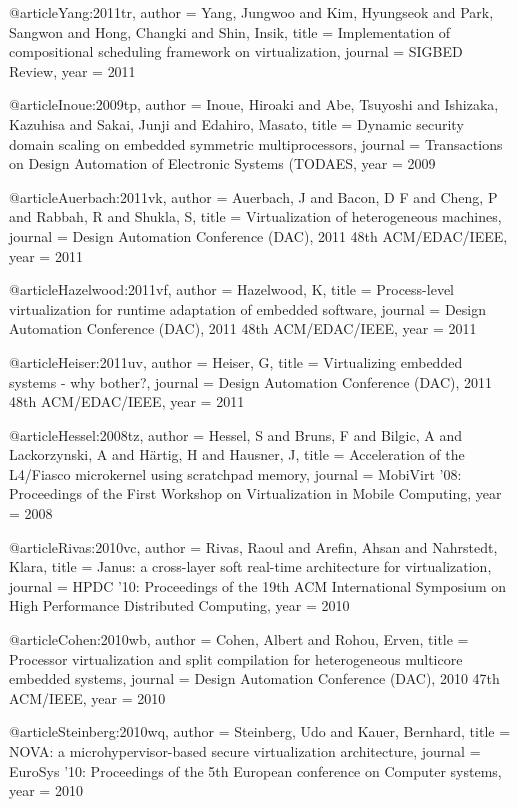 @article{Yang:2011tr,
author = {Yang, Jungwoo and Kim, Hyungseok and Park, Sangwon and Hong, Changki and Shin, Insik},
title = {{Implementation of compositional scheduling framework on virtualization}},
journal = {SIGBED Review},
year = {2011}
}

@article{Inoue:2009tp,
author = {Inoue, Hiroaki and Abe, Tsuyoshi and Ishizaka, Kazuhisa and Sakai, Junji and Edahiro, Masato},
title = {{Dynamic security domain scaling on embedded symmetric multiprocessors}},
journal = {Transactions on Design Automation of Electronic Systems (TODAES},
year = {2009}
}

@article{Auerbach:2011vk,
author = {Auerbach, J and Bacon, D F and Cheng, P and Rabbah, R and Shukla, S},
title = {{Virtualization of heterogeneous machines}},
journal = {Design Automation Conference (DAC), 2011 48th ACM/EDAC/IEEE},
year = {2011}
}

@article{Hazelwood:2011vf,
author = {Hazelwood, K},
title = {{Process-level virtualization for runtime adaptation of embedded software}},
journal = {Design Automation Conference (DAC), 2011 48th ACM/EDAC/IEEE},
year = {2011}
}

@article{Heiser:2011uv,
author = {Heiser, G},
title = {{Virtualizing embedded systems - why bother?}},
journal = {Design Automation Conference (DAC), 2011 48th ACM/EDAC/IEEE},
year = {2011}
}

@article{Hessel:2008tz,
author = {Hessel, S and Bruns, F and Bilgic, A and Lackorzynski, A and H{\"a}rtig, H and Hausner, J},
title = {{Acceleration of the L4/Fiasco microkernel using scratchpad memory}},
journal = {MobiVirt '08: Proceedings of the First Workshop on Virtualization in Mobile Computing},
year = {2008}
}

@article{Rivas:2010vc,
author = {Rivas, Raoul and Arefin, Ahsan and Nahrstedt, Klara},
title = {{Janus: a cross-layer soft real-time architecture for virtualization}},
journal = {HPDC '10: Proceedings of the 19th ACM International Symposium on High Performance Distributed Computing},
year = {2010}
}

@article{Cohen:2010wb,
author = {Cohen, Albert and Rohou, Erven},
title = {{Processor virtualization and split compilation for heterogeneous multicore embedded systems}},
journal = {Design Automation Conference (DAC), 2010 47th ACM/IEEE},
year = {2010}
}

@article{Steinberg:2010wq,
author = {Steinberg, Udo and Kauer, Bernhard},
title = {{NOVA: a microhypervisor-based secure virtualization architecture}},
journal = {EuroSys '10: Proceedings of the 5th European conference on Computer systems},
year = {2010}
}

